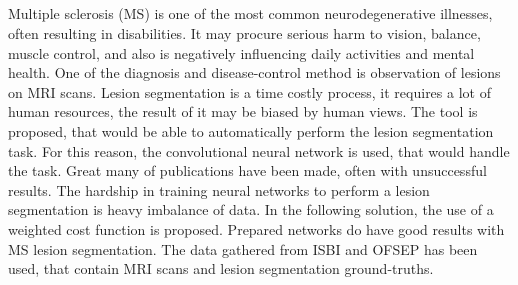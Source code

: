 
\begin{centering}
\section*{\large\ThesisEN}
\end{centering}


Multiple sclerosis (MS) is one of the most common neurodegenerative illnesses, often resulting in disabilities. It may procure serious harm to vision, balance, muscle control, and also is negatively influencing daily activities and mental health. One of the diagnosis and disease-control method is observation of lesions on MRI scans. Lesion segmentation is a time costly process, it requires a lot of human resources, the result of it may be biased by human views. The tool is proposed, that would be able to automatically perform the lesion segmentation task. For this reason, the convolutional neural network is used, that would handle the task. Great many of publications have been made, often with unsuccessful results. The hardship in training neural networks to perform a lesion segmentation is heavy imbalance of data. In the following solution, the use of a weighted cost function is proposed. Prepared networks do have good results with MS lesion segmentation. The data gathered from ISBI and OFSEP has been used, that contain MRI scans and lesion segmentation ground-truths.